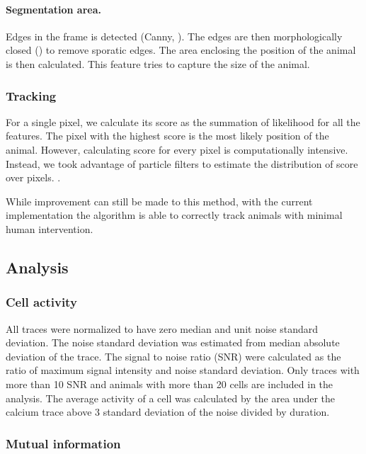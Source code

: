\paragraph{Segmentation area.} Edges in the frame is detected (Canny, ). The edges are then morphologically closed () to remove sporatic edges. The area enclosing the position of the animal is then calculated. This feature tries to capture the size of the animal.


\subsubsection{Tracking}

For a single pixel, we calculate its score as the summation of likelihood for all the features. The pixel with the highest score is the most likely position of the animal. However, calculating score for every pixel is computationally intensive. Instead, we took advantage of particle filters to estimate the distribution of score over pixels. .

While improvement can still be made to this method, with the current implementation the algorithm is able to correctly track animals with minimal human intervention. 


\subsection{Analysis}

\subsubsection{Cell activity}

All traces were normalized to have zero median and unit noise standard deviation. The noise standard deviation was estimated from median absolute deviation of the trace. The signal to noise ratio (SNR) were calculated as the ratio of maximum signal intensity and noise standard deviation. Only traces with more than 10 SNR and animals with more than 20 cells are included in the analysis. The average activity of a cell was calculated by the area under the calcium trace above 3 standard deviation of the noise divided by duration.

\subsubsection{Mutual information}

